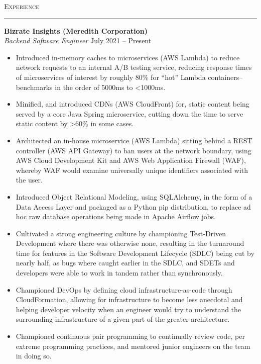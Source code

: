 \documentclass{res}
\begin{document}
\begin{resume}
\textsc{{\Large Experience}}
\vspace{0.5mm}
\hrule width18.5cm
\textbf{Bizrate Insights (Meredith Corporation)}\\
\textit{Backend Software Engineer}
\hfill
July 2021 -- Present\\[1mm]
	\begin{itemize}
		\vspace{-3mm}
    \item Introduced in-memory caches to microservices (AWS Lambda) to reduce network requests to an internal A/B testing service, reducing response times of microservices of interest by roughly 80\% for ``hot'' Lambda containers--benchmarks in the order of 5000ms to \textless 1000ms.
    \item Minified, and introduced CDNs (AWS CloudFront) for, static content being served by a core Java Spring microservice, cutting down the time to serve static content by \textgreater 60\% in some cases.
    \item Architected an in-house microservice (AWS Lambda) sitting behind a REST controller (AWS API Gateway) to ban users at the network boundary, using AWS Cloud Development Kit and AWS Web Application Firewall (WAF), whereby WAF would examine universally unique identifiers associated with the user.
    \item Introduced Object Relational Modeling, using SQLAlchemy, in the form of a Data Access Layer and packaged as a Python pip distribution, to replace ad hoc raw database operations being made in Apache Airflow jobs.
    \item Cultivated a strong engineering culture by championing Test-Driven Development where there was otherwise none, resulting in the turnaround time for features in the Software Development Lifecycle (SDLC) being cut by nearly half, as bugs where caught earlier in the SDLC, and SDETs and developers were able to work in tandem rather than synchronously.
    \item Championed DevOps by defining cloud infrastructure-as-code through CloudFormation, allowing for infrastructure to become less anecdotal and helping developer velocity when an engineer would try to understand the surrounding infrastructure of a given part of the greater architecture.
    \item Championed continuous pair programming to continually review code, per extreme programming practices, and mentored junior engineers on the team in doing so.

\end{itemize}
\end{resume}
\end{document}
